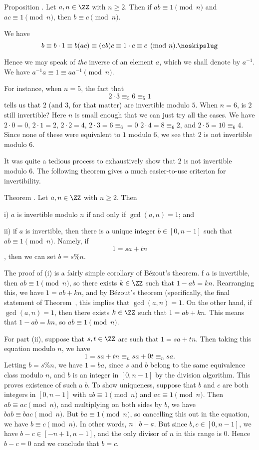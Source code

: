 \proclaim Proposition \advthm. Let $a,n\in \ZZ$ with $n\ge 2$. Then if $ab \equiv 1\pmod n$
and $ac\equiv 1\pmod n$, then $b\equiv c\pmod n$.

\proof We have
$$b \equiv b\cdot 1 \equiv b(ac) \equiv (ab)c \equiv 1\cdot c \equiv c\pmod n.\noskipslug$$

Hence we may speak of {\it the} inverse of an element $a$, which we shall denote by $a^{-1}$.
We have $a^{-1}a \equiv 1 \equiv a a^{-1}\pmod n$.

For instance, when $n=5$, the fact that
$$2\cdot 3 \equiv_5 6\equiv_5 1$$
tells us that $2$ (and $3$, for that matter) are invertible modulo $5$.
When $n=6$, is $2$ still invertible? Here $n$ is small enough that we can just try all the cases.
We have $2\cdot 0 = 0$, $2\cdot 1 = 2$, $2\cdot 2 = 4$, $2\cdot 3 = 6\equiv_6 = 0$
$2\cdot 4 = 8 \equiv_6 2$, and $2\cdot 5 = 10\equiv_6 4$. Since none of these were equivalent
to $1$ modulo $6$, we see that $2$ is not invertible modulo $6$.

It was quite a tedious process to exhaustively show that $2$ is not invertible modulo $6$. The following
theorem gives a much easier-to-use criterion for invertibility.

\proclaim Theorem \advthm. Let $a,n\in \ZZ$ with $n\ge 2$. Then
\medskip
\item{i)} $a$ is invertible modulo $n$ if and only if $\gcd(a,n) = 1$; and
\smallskip
\item{ii)} if $a$ is invertible, then there is a unique integer $b\in [0,n-1]$ such that
$ab\equiv 1\pmod n$. Namely, if
$$1 = sa + tn$$,
then we can set $b = s\percent n$.
\medskip

\proof The proof of (i) is a fairly simple corollary of B\'ezout's theorem.
f $a$ is invertible, then $ab\equiv 1\pmod n$, so there exists $k\in \ZZ$ such that
$1-ab=kn$. Rearranging this, we have $1 = ab+kn$, and by B\'ezout's theorem (specifically,
the final statement of Theorem~{\thmbezout}, this implies that $\gcd(a,n) = 1$.
On the other hand, if $\gcd(a,n) = 1$, then there exists $k\in \ZZ$ such that
$1 = ab + kn$. This means that $1-ab = kn$, so $ab\equiv 1\pmod n$.

For part (ii), suppose that $s,t\in \ZZ$ are such that $1 = sa+tn$. Then
taking this equation modulo $n$, we have
$$ 1 = sa+tn \equiv_n sa + 0t \equiv_n sa.$$
Letting $b = s\percent n$, we have $1 = ba$, since $s$ and $b$ belong to the same
equivalence class modulo $n$, and $b$ is an integer in $[0,n-1]$ by the division algorithm.
This proves existence of such a $b$. To show uniqueness, suppose that $b$ and $c$ are both
integers in $[0,n-1]$ with $ab \equiv 1\pmod n$ and $ac\equiv 1\pmod n$. Then
$ab\equiv ac\pmod n$, and multiplying on both sides by $b$, we have $bab\equiv bac\pmod n$.
But $ba\equiv 1\pmod n$, so cancelling this out in the equation, we have $b\equiv c\pmod n$.
In other words, $n\mid b-c$. But since $b,c\in [0,n-1]$, we have $b-c\in [-n+1, n-1]$,
and the only divisor of $n$ in this range is $0$. Hence $b-c = 0$ and we conclude that $b=c$.\slug

